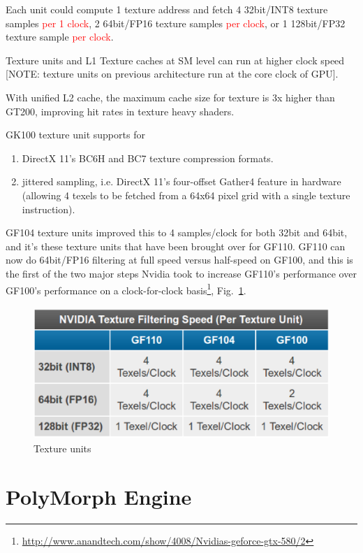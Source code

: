 Each unit could compute 1 texture address and fetch 4 32bit/INT8 texture samples
\textcolor{red}{per 1 clock}, 2 64bit/FP16 texture samples \textcolor{red}{per
clock}, or 1 128bit/FP32 texture sample \textcolor{red}{per clock}. 

Texture units and L1 Texture caches at SM level can run at higher clock speed
[NOTE: texture units on previous architecture run at the core clock of GPU].

With unified L2 cache, the maximum cache size for texture is 3x higher than
GT200, improving hit rates in texture heavy shaders. 

GK100 texture unit supports for
\begin{enumerate}
  \item  DirectX 11's BC6H and BC7 texture compression formats.
  \item jittered sampling, i.e. DirectX 11's four-offset Gather4 feature in
  hardware (allowing 4 texels to be fetched from a 64x64 pixel grid with a
  single texture instruction).
\end{enumerate} 

GF104 texture units improved this to 4 samples/clock for both 32bit
and 64bit, and it's these texture units that have been brought over
for GF110. GF110 can now do 64bit/FP16 filtering at full speed versus
half-speed on GF100, and this is the first of the two major steps
Nvidia took to increase GF110's performance over GF100's performance
on a clock-for-clock
basis\footnote{\url{http://www.anandtech.com/show/4008/Nvidias-geforce-gtx-580/2}},
Fig.~\ref{fig:texture_unit}.

\begin{figure}[hbt]
  \centerline{\includegraphics[height=5cm,
    angle=0]{./images/texture_unit.eps}}
  \caption{Texture units}
  \label{fig:texture_unit}
\end{figure}

\section{PolyMorph Engine}
\label{sec:PolyMorph-Engine}


